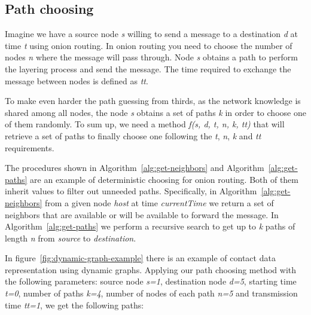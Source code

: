 \subsection{Path choosing}


Imagine we have a source node \textit{s} willing to send a message to a destination \textit{d} at time \textit{t} using onion routing. In onion routing you need to choose the number of nodes  \textit{n} where the message will pass through. Node \textit{s} obtains a path to perform the layering process and send the message. The time required to exchange the message between nodes is defined as \textit{tt}. 

To make even harder the path guessing from thirds, as the network knowledge is shared among all nodes, the node \textit{s} obtains a set of paths \textit{k} in order to choose one of them randomly. To sum up, we need a method \textit{f(s, d, t, n, k, tt)} that will retrieve a set of paths to finally choose one following the \textit{t}, \textit{n}, \textit{k} and \textit{tt} requirements. 

The procedures shown in Algorithm~\ref{alg:get-neighbors} and Algorithm~\ref{alg:get-paths} are an example of deterministic choosing for onion routing. Both of them inherit values to filter out unneeded paths. Specifically, in Algorithm~\ref{alg:get-neighbors} from a given node \textit{host} at time \textit{currentTime} we return a set of neighbors  that are available or will be available to forward the message. In Algorithm~\ref{alg:get-paths} we perform a recursive search to get up to \textit{k} paths of length \textit{n} from \textit{source} to \textit{destination}.

In figure~\ref{fig:dynamic-graph-example} there is an example of contact data representation using dynamic graphs. Applying our path choosing method with the following parameters: source node \textit{s=1}, destination node \textit{d=5}, starting time \textit{t=0}, number of paths \textit{k=4}, number of nodes of each path \textit{n=5} and transmission time \textit{tt=1}, we get the following paths: \\

